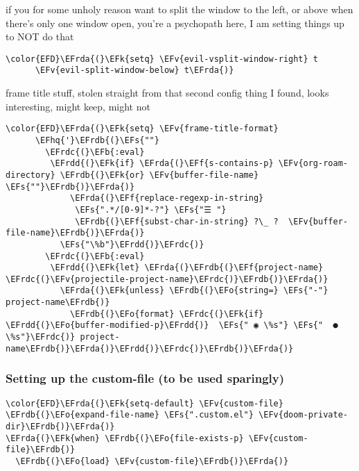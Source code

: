 \documentclass{article}
\newcommand{\EFs}[1]{\textcolor{EFs}{#1}} %
\newcommand{\EFk}[1]{\textcolor{EFk}{#1}} %
\newcommand{\EFb}[1]{\textcolor{EFb}{#1}} %
\newcommand{\EFf}[1]{\textcolor{EFf}{#1}} %
\newcommand{\EFv}[1]{\textcolor{EFv}{#1}} %
\newcommand{\EFo}[1]{\textcolor{EFo}{#1}} %
\newcommand{\EFhq}[1]{#1} %
\newcommand{\EFrda}[1]{\textcolor{EFrda}{#1}} %
\newcommand{\EFrdb}[1]{\textcolor{EFrdb}{#1}} %
\newcommand{\EFrdc}[1]{\textcolor{EFrdc}{#1}} %
\newcommand{\EFrdd}[1]{\textcolor{EFrdd}{#1}} %
\begin{document}
if you for some unholy reason want to split the window to the left, or above when there's only one window open,
you're a psychopath here, I am setting things up to NOT do that
\begin{Code}
\begin{Verbatim}
\color{EFD}\EFrda{(}\EFk{setq} \EFv{evil-vsplit-window-right} t
      \EFv{evil-split-window-below} t\EFrda{)}
\end{Verbatim}
\end{Code}

frame title stuff, stolen straight from that second config thing I found, looks interesting, might keep, might not

\begin{Code}
\begin{Verbatim}
\color{EFD}\EFrda{(}\EFk{setq} \EFv{frame-title-format}
      \EFhq{'}\EFrdb{(}\EFs{""}
        \EFrdc{(}\EFb{:eval}
         \EFrdd{(}\EFk{if} \EFrda{(}\EFf{s-contains-p} \EFv{org-roam-directory} \EFrdb{(}\EFk{or} \EFv{buffer-file-name} \EFs{""}\EFrdb{)}\EFrda{)}
             \EFrda{(}\EFf{replace-regexp-in-string}
              \EFs{".*/[0-9]*-?"} \EFs{"☰ "}
              \EFrdb{(}\EFf{subst-char-in-string} ?\_ ?  \EFv{buffer-file-name}\EFrdb{)}\EFrda{)}
           \EFs{"\%b"}\EFrdd{)}\EFrdc{)}
        \EFrdc{(}\EFb{:eval}
         \EFrdd{(}\EFk{let} \EFrda{(}\EFrdb{(}\EFf{project-name} \EFrdc{(}\EFv{projectile-project-name}\EFrdc{)}\EFrdb{)}\EFrda{)}
           \EFrda{(}\EFk{unless} \EFrdb{(}\EFo{string=} \EFs{"-"} project-name\EFrdb{)}
             \EFrdb{(}\EFo{format} \EFrdc{(}\EFk{if} \EFrdd{(}\EFo{buffer-modified-p}\EFrdd{)}  \EFs{" ◉ \%s"} \EFs{"  ●  \%s"}\EFrdc{)} project-name\EFrdb{)}\EFrda{)}\EFrdd{)}\EFrdc{)}\EFrdb{)}\EFrda{)}
\end{Verbatim}
\end{Code}


\subsubsection{Setting up the custom-file (to be used sparingly)}
\label{sec:org3d78750}
\begin{Code}
\begin{Verbatim}
\color{EFD}\EFrda{(}\EFk{setq-default} \EFv{custom-file} \EFrdb{(}\EFo{expand-file-name} \EFs{".custom.el"} \EFv{doom-private-dir}\EFrdb{)}\EFrda{)}
\EFrda{(}\EFk{when} \EFrdb{(}\EFo{file-exists-p} \EFv{custom-file}\EFrdb{)}
  \EFrdb{(}\EFo{load} \EFv{custom-file}\EFrdb{)}\EFrda{)}
\end{Verbatim}
\end{Code}
\end{document}
